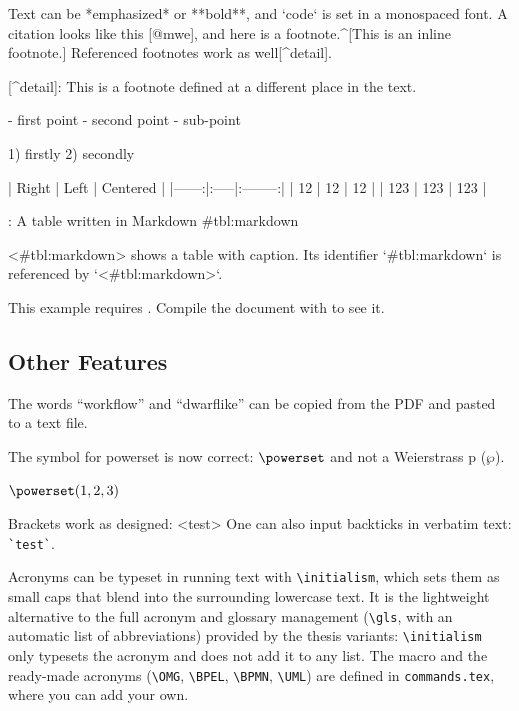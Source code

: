   \begin{ltgexample}
  \begin{markdown}
Text can be *emphasized* or **bold**, and `code` is set in a monospaced font.
A citation looks like this [@mwe], and here is a footnote.^[This is an inline footnote.]
Referenced footnotes work as well[^detail].

[^detail]: This is a footnote defined at a different place in the text.

- first point
- second point
  - sub-point

1) firstly
2) secondly

| Right | Left | Centered |
|------:|:-----|:--------:|
|    12 | 12   |    12    |
|   123 | 123  |   123    |

: A table written in Markdown {#tbl:markdown}

<#tbl:markdown> shows a table with caption.
Its identifier `{#tbl:markdown}` is referenced by `<#tbl:markdown>`.
\end{markdown}
  \end{ltgexample}
\else
  This example requires .
  Compile the document with  to see it.
\fi

\subsection{Other Features}

\begin{ltgexample}
The words \enquote{workflow} and \enquote{dwarflike} can be copied from the PDF and pasted to a text file.
\end{ltgexample}

\begin{ltgexample}
The symbol for powerset is now correct: $\powerset$ and not a Weierstrass p ($\wp$).

$\powerset({1,2,3})$
\end{ltgexample}

\begin{ltgexample}
Brackets work as designed:
<test>
One can also input backticks in verbatim text: \verb|`test`|.
\end{ltgexample}

Acronyms can be typeset in running text with \verb+\initialism+, which sets them as small caps that blend into the surrounding lowercase text. It is the lightweight alternative to the full acronym and glossary management (\verb+\gls+, with an automatic list of abbreviations) provided by the thesis variants: \verb+\initialism+ only typesets the acronym and does not add it to any list. The macro and the ready-made acronyms (\verb+\OMG+, \verb+\BPEL+, \verb+\BPMN+, \verb+\UML+) are defined in \texttt{commands.tex}, where you can add your own.

